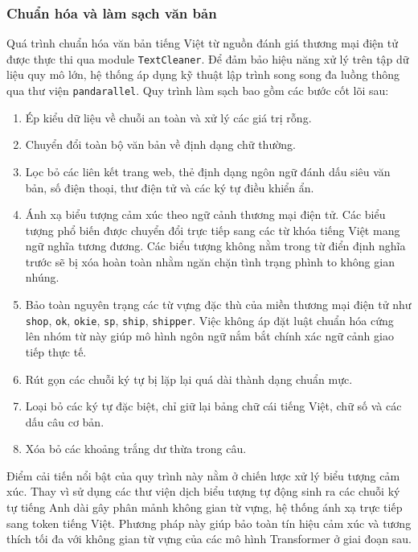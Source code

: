 \subsubsection{Chuẩn hóa và làm sạch văn bản}

Quá trình chuẩn hóa văn bản tiếng Việt từ nguồn đánh giá thương mại điện tử được thực thi qua module \texttt{TextCleaner}. Để đảm bảo hiệu năng xử lý trên tập dữ liệu quy mô lớn, hệ thống áp dụng kỹ thuật lập trình song song đa luồng thông qua thư viện \texttt{pandarallel}. Quy trình làm sạch bao gồm các bước cốt lõi sau:

\begin{enumerate}[labelsep=10pt, leftmargin=2cm]
    \item Ép kiểu dữ liệu về chuỗi an toàn và xử lý các giá trị rỗng.
    \item Chuyển đổi toàn bộ văn bản về định dạng chữ thường.
    \item Lọc bỏ các liên kết trang web, thẻ định dạng ngôn ngữ đánh dấu siêu văn bản, số điện thoại, thư điện tử và các ký tự điều khiển ẩn.
    \item Ánh xạ biểu tượng cảm xúc theo ngữ cảnh thương mại điện tử. Các biểu tượng phổ biến được chuyển đổi trực tiếp sang các từ khóa tiếng Việt mang ngữ nghĩa tương đương. Các biểu tượng không nằm trong từ điển định nghĩa trước sẽ bị xóa hoàn toàn nhằm ngăn chặn tình trạng phình to không gian nhúng.
    \item Bảo toàn nguyên trạng các từ vựng đặc thù của miền thương mại điện tử như \texttt{shop}, \texttt{ok}, \texttt{okie}, \texttt{sp}, \texttt{ship}, \texttt{shipper}. Việc không áp đặt luật chuẩn hóa cứng lên nhóm từ này giúp mô hình ngôn ngữ nắm bắt chính xác ngữ cảnh giao tiếp thực tế.
    \item Rút gọn các chuỗi ký tự bị lặp lại quá dài thành dạng chuẩn mực.
    \item Loại bỏ các ký tự đặc biệt, chỉ giữ lại bảng chữ cái tiếng Việt, chữ số và các dấu câu cơ bản.
    \item Xóa bỏ các khoảng trắng dư thừa trong câu.
\end{enumerate}

Điểm cải tiến nổi bật của quy trình này nằm ở chiến lược xử lý biểu tượng cảm xúc. Thay vì sử dụng các thư viện dịch biểu tượng tự động sinh ra các chuỗi ký tự tiếng Anh dài gây phân mảnh không gian từ vựng, hệ thống ánh xạ trực tiếp sang token tiếng Việt. Phương pháp này giúp bảo toàn tín hiệu cảm xúc và tương thích tối đa với không gian từ vựng của các mô hình Transformer ở giai đoạn sau.

